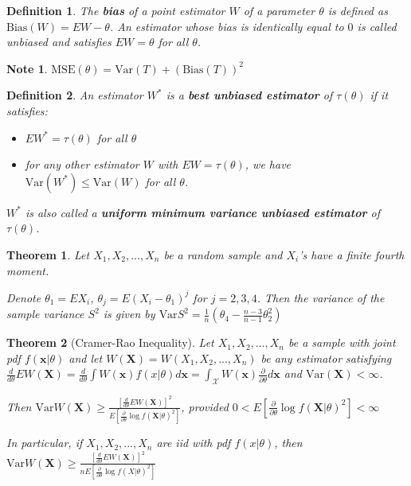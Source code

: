 \documentclass[14pt,twoside]{extreport}
\theoremstyle{dotless}
\newtheorem*{defn}{Definition}
\newtheorem*{thm}{Theorem} %
\newtheorem*{note}{Note} %
\begin{document}
\begin{defn}
    The \textbf{bias} of a point estimator $W$ of a parameter $\theta$ is defined as $\text{Bias}(W) = EW - \theta$. 
    An estimator whose bias is identically equal to $0$ is called unbiased and satisfies $EW = \theta$ for all $\theta$.
\end{defn}

\begin{note}
    $\text{MSE}(\theta) = \text{Var}(T) + (\text{Bias}(T))^2$
\end{note}

\begin{defn}
    An estimator $W^*$ is a \textbf{best unbiased estimator} of $\tau(\theta)$ if it satisfies:
    \begin{itemize}
        \item $EW^* = \tau(\theta)$ for all $\theta$
        \item for any other estimator $W$ with $EW = \tau(\theta)$, we have $\text{Var}(W^*) \leq \text{Var}(W)$ for all $\theta$.
    \end{itemize}
            $W^*$ is also called a \textbf{uniform minimum variance unbiased estimator} of $\tau(\theta)$.
\end{defn}

\begin{thm}
    Let $X_1, X_2, ..., X_n$ be a random sample and $X_i$'s have a finite fourth moment.

    Denote $\theta_1 = EX_i$, $\theta_j = E(X_i - \theta_1)^j$ for $j = 2, 3, 4$.
    Then the variance of the sample variance $S^2$ is given by $\text{Var}S^2 = \frac{1}{n} \left ( \theta_4 - \frac{n - 3}{n-1} \theta_2^2 \right )$
\end{thm}

\begin{thm}[Cramer-Rao Inequality]
    Let $X_1, X_2, ..., X_n$ be a sample with joint pdf $f(\bm{x} | \theta)$ and let $W(\bm{X}) = W(X_1, X_2, ..., X_n)$ be any estimator satisfying $\frac{d}{d\theta} EW(\bm{X}) = \frac{d}{d\theta} \int W(\bm{x}) f(x | \theta) d\bm{x} = \int_{\mathcal{X}} W(\bm{x}) \frac{\partial}{\partial \theta} d\bm{x}$ and $\text{Var}(\bm{X}) < \infty$.

    Then $\text{Var}W(\bm{X}) \geq \frac{[\frac{d}{d\theta} EW(\bm{X})]^2}{E[\frac{\partial}{\partial \theta} \log f(\bm{X}|\theta)^2]}$, provided $0 <  E[\frac{\partial}{\partial \theta} \log f(\bm{X}|\theta)^2] < \infty$

    In particular, if $X_1, X_2, ..., X_n$ are iid with pdf $f(x|\theta)$, then $\text{Var}W(\bm{X}) \geq \frac{[\frac{d}{d\theta} EW(\bm{X})]^2}{n E[\frac{\partial}{\partial \theta} \log f(X|\theta)^2]}$

\end{thm}
\end{document}
